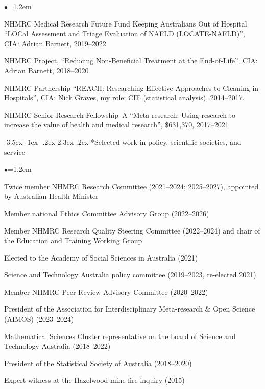 \documentclass[a4paper,11pt]{article}
\makeatletter
\renewcommand\section{\@startsection {section}{1}{\z@}%
                                   {-3.5ex \@plus -1ex \@minus -.2ex}%
                                   {2.3ex \@plus.2ex}%
                                   {\normalfont\large\bfseries\color{blue}}}
\renewcommand{\labelitemi}{$\bullet$}
\makeatother
\begin{document}
\begin{raggedright}
\begin{list}{\labelitemi}{\leftmargin=1.2em}
\item NHMRC Medical Research Future Fund Keeping Australians Out of Hospital ``LOCal Assessment and Triage Evaluation of NAFLD (LOCATE-NAFLD)'', CIA: Adrian Barnett, 2019--2022

\item NHMRC Project, ``Reducing Non-Beneficial Treatment at the End-of-Life'', CIA: Adrian Barnett, 2018--2020

\item NHMRC Partnership ``REACH: Researching Effective Approaches to Cleaning in Hospitals'', CIA: Nick Graves, my role: CIE (statistical analysis), 2014--2017.


\item NHMRC Senior Research Fellowship~A ``Meta-research: Using research to increase the value of health and medical research'', \$631,370, 2017--2021

\end{list}

\section*{Selected work in policy, scientific societies, and service}

\begin{list}{\labelitemi}{\leftmargin=1.2em}\addtolength{\itemsep}{-0.4\baselineskip}
\item Twice member NHMRC Research Committee (2021--2024; 2025--2027), appointed by Australian Health Minister
\item Member national Ethics Committee Advisory Group (2022--2026)
\item Member NHMRC Research Quality Steering Committee (2022--2024) and chair of the Education and Training Working Group 
\item Elected to the Academy of Social Sciences in Australia (2021)
\item Science and Technology Australia policy committee (2019--2023, re-elected 2021)
\item Member NHMRC Peer Review Advisory Committee (2020--2022)
\item President of the Association for Interdisciplinary Meta-research \& Open Science (AIMOS) (2023--2024)
\item Mathematical Sciences Cluster representative on the board of Science and Technology Australia (2018--2022)
\item President of the Statistical Society of Australia (2018--2020)
\item Expert witness at the Hazelwood mine fire inquiry (2015)
\end{list}

\end{raggedright}
\end{document}
